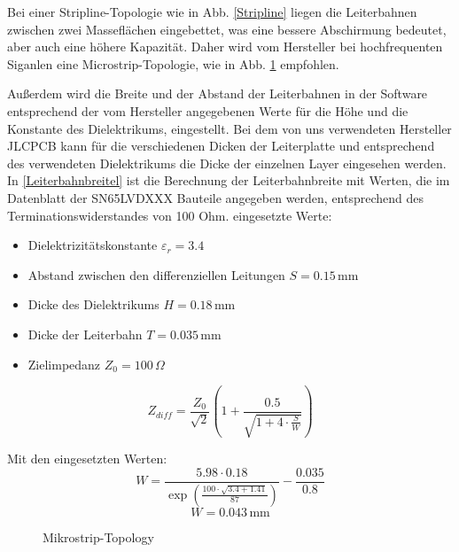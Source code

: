  
Bei einer Stripline-Topologie wie in Abb. \ref{Stripline} liegen die Leiterbahnen zwischen zwei Masseflächen eingebettet, was eine bessere Abschirmung bedeutet, aber auch eine höhere Kapazität. Daher wird vom Hersteller bei hochfrequenten Siganlen eine Microstrip-Topologie, wie in Abb. \ref{MikrostripTopology} empfohlen. 



Außerdem wird die Breite und der Abstand der Leiterbahnen in der Software entsprechend der vom Hersteller angegebenen Werte für die Höhe und die Konstante des Dielektrikums, eingestellt. Bei dem von uns verwendeten Hersteller JLCPCB kann für die verschiedenen Dicken der Leiterplatte und entsprechend des verwendeten Dielektrikums die Dicke der einzelnen Layer eingesehen werden. 
In \ref{Leiterbahnbreitel} ist die Berechnung der Leiterbahnbreite mit Werten, die im Datenblatt der SN65LVDXXX Bauteile angegeben werden, entsprechend des Terminationswiderstandes von 100 Ohm.
\newline
eingesetzte Werte:
\begin{itemize}
	\item Dielektrizitätskonstante \( \varepsilon_r = 3.4 \)
	\item Abstand zwischen den differenziellen Leitungen \( S = 0.15 \, \text{mm} \)
	\item Dicke des Dielektrikums \( H = 0.18 \, \text{mm} \)
	\item Dicke der Leiterbahn \( T = 0.035 \, \text{mm} \)
	\item Zielimpedanz \( Z_0 = 100 \, \Omega \)
\end{itemize}



\begin{equation} \label{Impedanz}
	Z_{diff} = \frac{Z_0}{\sqrt{2}} \left( 1 + \frac{0.5}{\sqrt{1 + 4\cdot \frac{S}{W}}} \right)
\end{equation}


Mit den eingesetzten Werten:
\begin{equation} \label{Leiterbahnbreite}
W = \frac{5.98 \cdot 0.18}{\exp\left(\frac{100 \cdot \sqrt{3.4 + 1.41}}{87}\right)} - \frac{0.035}{0.8}

\end{equation}
\begin{equation} \label{Leiterbahnbreite}
W = 0.043 \, \text{mm}
\end{equation}


\begin{figure}[H]
	\centering    
	\caption{Mikrostrip-Topology}
	\label{MikrostripTopology}
\end{figure}

